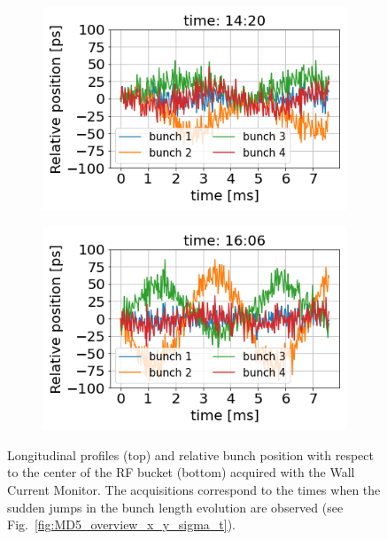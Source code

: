 \begin{figure}[!ht]
\begin{subfigure}[t]{0.42\textwidth}
       \includegraphics[width=1\textwidth]{./images/Ch5/bunchPosition_MD_115.png}
       
   \end{subfigure}
   \hfill
   \begin{subfigure}[t]{0.42\textwidth}
       \centering
       \includegraphics[width=1\textwidth]{./images/Ch5/bunchPosition_MD_126.png}
   \end{subfigure}
   \hfill
   \caption{Longitudinal profiles (top) and relative bunch position with respect to the center of the RF bucket (bottom) acquired with the Wall Current Monitor. The acquisitions correspond to the times when the sudden jumps in the bunch length evolution are observed (see Fig.~\ref{fig:MD5_overview_x_y_sigma_t}).}
   \label{fig:long_profiles_and_rel_bunch_position_2018}
\end{figure}
